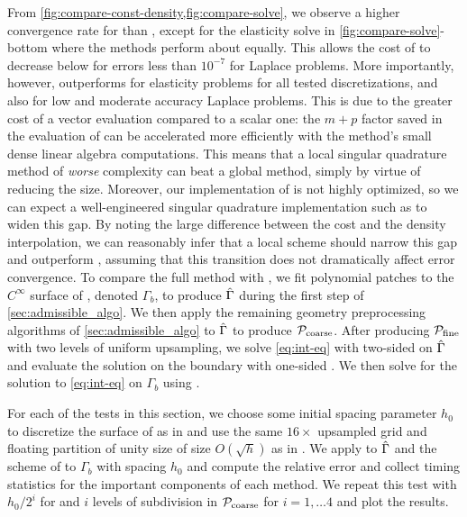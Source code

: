 From \cref{fig:compare-const-density,fig:compare-solve}, we observe a higher convergence rate for \qbkix than \cite{YBZ}, except for the elasticity solve in \cref{fig:compare-solve}-bottom where the methods perform about equally.
This allows the cost of \qbkix to decrease below \cite{YBZ} for errors less than $10^{-7}$ for Laplace problems.
More importantly, however, \cite{YBZ} outperforms \qbkix for elasticity problems for all tested discretizations, and also for low and moderate accuracy Laplace problems.
This is due to the greater cost of a vector \fmm evaluation compared to a scalar one: the $m+p$ factor saved in the \fmm evaluation of \cite{YBZ} can be accelerated more efficiently with the method's small dense linear algebra computations.
This means that a local singular quadrature method of \textit{worse} complexity can beat a global method, simply by virtue of reducing the \fmm size.
Moreover, our implementation of \cite{YBZ} is not highly optimized, so we can expect a well-engineered \pou singular quadrature implementation such as \cite{malhotra2019taylor} to widen this gap.
By noting the large difference between the \qbkix \fmm cost and the \qbkix density interpolation, we can reasonably infer that a local \qbkix scheme should narrow this gap and outperform \cite{YBZ}, assuming that this transition does not dramatically affect error convergence.
\iffalse
To compare the full \qbkix method with \cite{YBZ}, we fit polynomial patches to the $C^\infty$ surface of \cite{ying2004simple}, denoted $\Gamma_b$, to produce $\hat{\Gamma}$ during the first step of \cref{sec:admissible_algo}.
We then apply the remaining geometry preprocessing algorithms of \cref{sec:admissible_algo} to $\hat{\Gamma}$ to produce ${\mathcal{P}_{\mathrm{coarse}}}$.
After producing ${\mathcal{P}_{\mathrm{fine}}}$ with two levels of uniform upsampling, we solve \cref{eq:int-eq} with two-sided \qbkix on $\hat{\Gamma}$ and evaluate the solution on the boundary with one-sided \qbkix.
We then solve for the solution to \cref{eq:int-eq} on $\Gamma_b$ using \cite{YBZ}. 

For each of the tests in this section, we choose some initial spacing parameter $h_0$ to discretize the surface of \cite{ying2004simple} as in \cite{YBZ} and use the same $16\times$ upsampled grid and floating partition of unity size of size $O(\sqrt{h})$ as in \cite{YBZ}.
We apply \qbkix to $\hat{\Gamma}$ and the scheme of \cite{YBZ} to $\Gamma_b$ with spacing $h_0$ and compute the relative error and collect timing statistics for the important components of each method.
We repeat this test with $h_0/2^i$ for \cite{YBZ} and $i$ levels of subdivision in ${\mathcal{P}_{\mathrm{coarse}}}$ for $i=1,\hdots 4$ and plot the results.

